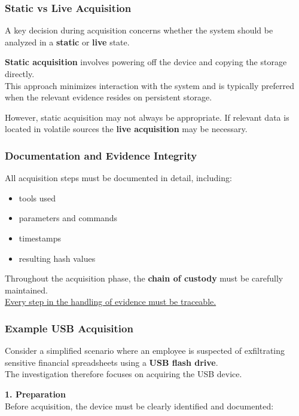 \subsubsection{Static vs Live Acquisition}

A key decision during acquisition concerns whether the system should be analyzed in a \textbf{static} or \textbf{live} state.
\medskip

\noindent
\textbf{Static acquisition} involves powering off the device and copying the storage directly.\\  
This approach minimizes interaction with the system and is typically preferred when the relevant evidence resides on persistent storage.
\medskip

\noindent
However, static acquisition may not always be appropriate. If relevant data is located in volatile sources the \textbf{live acquisition} may be necessary.

\subsubsection{Documentation and Evidence Integrity}

All acquisition steps must be documented in detail, including:

\begin{itemize}
\item tools used
\item parameters and commands
\item timestamps
\item resulting hash values
\end{itemize}

\noindent
Throughout the acquisition phase, the \textbf{chain of custody} must be carefully maintained.\\
\underline{Every step in the handling of evidence must be traceable.}


\subsubsection{Example USB Acquisition}

Consider a simplified scenario where an employee is suspected of exfiltrating sensitive financial spreadsheets using a \textbf{USB flash drive}.\\
The investigation therefore focuses on acquiring the USB device.
\medskip

\noindent
\textbf{1. Preparation}\\
Before acquisition, the device must be clearly identified and documented:

